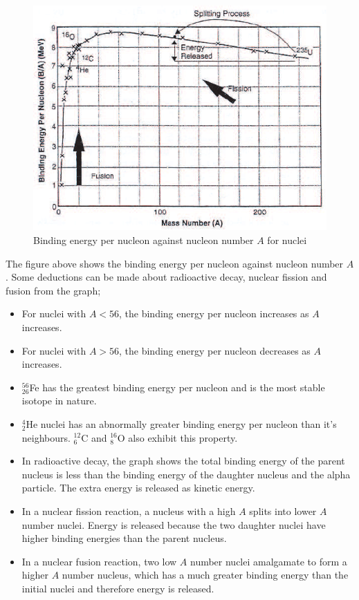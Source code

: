 \begin{figure}[h!]
    \centering
    \includegraphics[scale=0.75]{notes/images/BE-Per-Nucleon.JPG}
    \caption{Binding energy per nucleon against nucleon number $A$ for nuclei}
    \label{fig:be-per-nucleon}
\end{figure}
\FloatBarrier

The figure above shows the binding energy per nucleon against nucleon number $A$. Some deductions can be made about radioactive decay, nuclear fission and fusion from the graph;
\begin{itemize}
    \item For nuclei with $A < 56$, the binding energy per nucleon increases as $A$ increases.
    \item For nuclei with $A > 56$, the binding energy per nucleon decreases as $A$ increases.
    \item $_{26}^{56}$Fe has the greatest binding energy per nucleon and is the most stable isotope in nature.
    \item $_{2}^4$He nuclei has an abnormally greater binding energy per nucleon than it's neighbours. $_6^{12}$C and $_8^{16}$O also exhibit this property.
    \item In radioactive decay, the graph shows the total binding energy of the parent nucleus is less than the binding energy of the daughter nucleus and the alpha particle. The extra energy is released as kinetic energy.
    \item In a nuclear fission reaction, a nucleus with a high $A$ splits into lower $A$ number nuclei. Energy is released because the two daughter nuclei have higher binding energies than the parent nucleus. 
    \item In a nuclear fusion reaction, two low $A$ number nuclei amalgamate to form a higher $A$ number nucleus, which has a much greater binding energy than the initial nuclei and therefore energy is released. 
    
\end{itemize}
